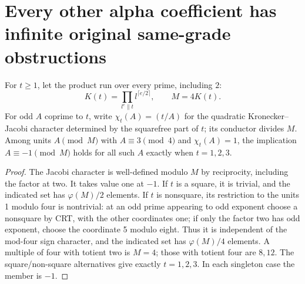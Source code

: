 \section{Every other alpha coefficient has infinite original same-grade obstructions}
\begin{lemma}
For $t\ge1$, let the product run over every prime, including \(2\):
\[
 K(t)=\prod_{l^e\parallel t}l^{\lceil e/2\rceil},\qquad M=4K(t).
\]
For odd \(A\) coprime to \(t\), write
\(\chi_t(A)=(t/A)\) for the quadratic Kronecker--Jacobi character determined
by the squarefree part of \(t\); its conductor divides \(M\).  Among units
\(A\pmod M\) with \(A\equiv3\pmod4\) and \(\chi_t(A)=1\), the implication
$A\equiv-1\pmod M$ holds for all such $A$ exactly when $t=1,2,3$.
\end{lemma}
\begin{proof}
The Jacobi character is well-defined modulo $M$ by reciprocity, including the
factor at two. It takes value one at $-1$. If $t$ is a square, it is trivial,
and the indicated set has $\varphi(M)/2$ elements. If $t$ is nonsquare, its
restriction to the units 1 modulo four is nontrivial: at an odd prime appearing
to odd exponent choose a nonsquare by CRT, with the other coordinates one; if
only the factor two has odd exponent, choose the coordinate 5 modulo eight.
Thus it is independent of the mod-four sign character, and the indicated set
has $\varphi(M)/4$ elements. A multiple of four with totient two is $M=4$;
those with totient four are $8,12$. The square/non-square alternatives give
exactly $t=1,2,3$. In each singleton case the member is $-1$.
\end{proof}

